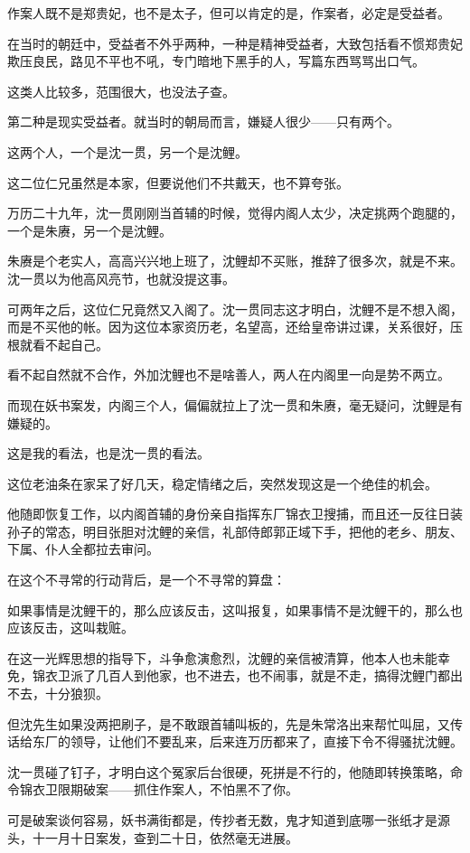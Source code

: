 \begin{multicols}{\theparacolNo}
		作案人既不是郑贵妃，也不是太子，但可以肯定的是，作案者，必定是受益者。

		在当时的朝廷中，受益者不外乎两种，一种是精神受益者，大致包括看不惯郑贵妃欺压良民，路见不平也不吼，专门暗地下黑手的人，写篇东西骂骂出口气。

		这类人比较多，范围很大，也没法子查。

		第二种是现实受益者。就当时的朝局而言，嫌疑人很少——只有两个。

		这两个人，一个是沈一贯，另一个是沈鲤。

		这二位仁兄虽然是本家，但要说他们不共戴天，也不算夸张。

		万历二十九年，沈一贯刚刚当首辅的时候，觉得内阁人太少，决定挑两个跑腿的，一个是朱赓，另一个是沈鲤。

		朱赓是个老实人，高高兴兴地上班了，沈鲤却不买账，推辞了很多次，就是不来。沈一贯以为他高风亮节，也就没提这事。

		可两年之后，这位仁兄竟然又入阁了。沈一贯同志这才明白，沈鲤不是不想入阁，而是不买他的帐。因为这位本家资历老，名望高，还给皇帝讲过课，关系很好，压根就看不起自己。

		看不起自然就不合作，外加沈鲤也不是啥善人，两人在内阁里一向是势不两立。

		而现在妖书案发，内阁三个人，偏偏就拉上了沈一贯和朱赓，毫无疑问，沈鲤是有嫌疑的。

		这是我的看法，也是沈一贯的看法。

		这位老油条在家呆了好几天，稳定情绪之后，突然发现这是一个绝佳的机会。

		他随即恢复工作，以内阁首辅的身份亲自指挥东厂锦衣卫搜捕，而且还一反往日装孙子的常态，明目张胆对沈鲤的亲信，礼部侍郎郭正域下手，把他的老乡、朋友、下属、仆人全都拉去审问。

		在这个不寻常的行动背后，是一个不寻常的算盘：

		如果事情是沈鲤干的，那么应该反击，这叫报复，如果事情不是沈鲤干的，那么也应该反击，这叫栽赃。

		在这一光辉思想的指导下，斗争愈演愈烈，沈鲤的亲信被清算，他本人也未能幸免，锦衣卫派了几百人到他家，也不进去，也不闹事，就是不走，搞得沈鲤门都出不去，十分狼狈。

		但沈先生如果没两把刷子，是不敢跟首辅叫板的，先是朱常洛出来帮忙叫屈，又传话给东厂的领导，让他们不要乱来，后来连万历都来了，直接下令不得骚扰沈鲤。

		沈一贯碰了钉子，才明白这个冤家后台很硬，死拼是不行的，他随即转换策略，命令锦衣卫限期破案——抓住作案人，不怕黑不了你。

		可是破案谈何容易，妖书满街都是，传抄者无数，鬼才知道到底哪一张纸才是源头，十一月十日案发，查到二十日，依然毫无进展。


\end{multicols}
